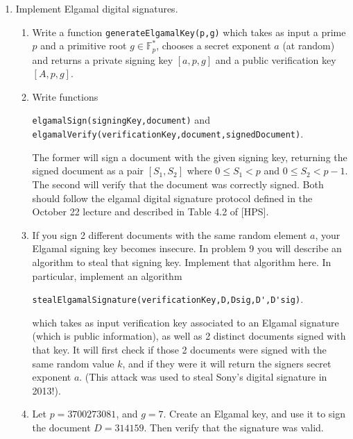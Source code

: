\documentclass[11pt]{article}
\newcommand{\bF}{\mathbb{F}}
\begin{document}
\begin{enumerate}
{\begin{enumerate}
{    \newpage
    $D'^{sig} =\\ \seqsplit{%
    90592809313509991477767898543561252818730285233946708276918316631997361944737647286633671059236656863128827269012547659105911490655257488384426092740746945829967538162116044915055692244129577771297348901913124079826581655154147415714324848399155672059930064485203220452985824881282662030076919344957027591627}$\\
    Which message is truthful?
    }
  \end{enumerate}
  }
  \item{
  Implement Elgamal digital signatures.
  \begin{enumerate}
    \item{
    Write a function \verb|generateElgamalKey(p,g)| which takes as input a prime $p$ and a primitive root $g\in\bF_p^*$, chooses a secret exponent $a$ (at random) and returns a private signing key $[a,p,g]$ and a public verification key $[A,p,g]$.
    }
    \item{
    Write functions \begin{center}\verb|elgamalSign(signingKey,document)| and \verb|elgamalVerify(verificationKey,document,signedDocument)|.\end{center}
    The former will sign a document with the given signing key, returning the signed document as a pair $[S_1,S_2]$ where $0\le S_1<p$ and $0\le S_2<p-1$.  The second will verify that the document was correctly signed.  Both should follow the elgamal digital signature protocol defined in the October 22 lecture and described in Table 4.2 of [HPS].
    }
    \item{
    If you sign 2 different documents with the same random element $a$, your Elgamal signing key becomes insecure.  In problem 9 you will describe an algorithm to steal that signing key.  Implement that algorithm here.  In particular, implement an algorithm
    \begin{center}
      \verb|stealElgamalSignature(verificationKey,D,Dsig,D',D'sig)|.
    \end{center}
    which takes as input verification key associated to an Elgamal signature (which is public information), as well as 2 distinct documents signed with that key.  It will first check if those 2 documents were signed with the same random value $k$, and if they were it will return the signers secret exponent $a$.  (This attack was used to steal Sony's digital signature in 2013!).
    }
    \item{
    Let $p=3700273081$, and $g=7$.  Create an Elgamal key, and use it to sign the document $D = 314159$.  Then verify that the signature was valid.
}
\end{enumerate}}
\end{enumerate}
\end{document}
